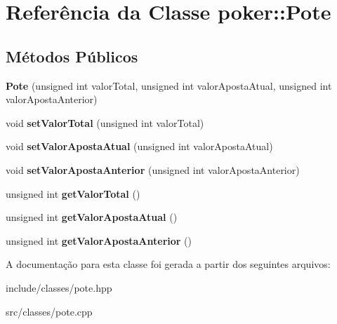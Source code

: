 \hypertarget{classpoker_1_1Pote}{}\section{Referência da Classe poker\+:\+:Pote}
\label{classpoker_1_1Pote}
\subsection*{Métodos Públicos}
\begin{DoxyCompactItemize}
\item 
\mbox{\label{classpoker_1_1Pote_a7cef08264753e9e262811537c40b81eb}} 
{\bfseries Pote} (unsigned int valor\+Total, unsigned int valor\+Aposta\+Atual, unsigned int valor\+Aposta\+Anterior)
\item 
\mbox{\label{classpoker_1_1Pote_a126929e2fed7d8b3deed764a49e31e05}} 
void {\bfseries set\+Valor\+Total} (unsigned int valor\+Total)
\item 
\mbox{\label{classpoker_1_1Pote_a06585f07d25bc2c133bfb0eee08a5b84}} 
void {\bfseries set\+Valor\+Aposta\+Atual} (unsigned int valor\+Aposta\+Atual)
\item 
\mbox{\label{classpoker_1_1Pote_acf4aab4e5eb1494d9dc9169ea4fe1ac1}} 
void {\bfseries set\+Valor\+Aposta\+Anterior} (unsigned int valor\+Aposta\+Anterior)
\item 
\mbox{\label{classpoker_1_1Pote_a79df2aa60ae9addc6f3a663faad85d9a}} 
unsigned int {\bfseries get\+Valor\+Total} ()
\item 
\mbox{\label{classpoker_1_1Pote_a4f5dc5e112c4483d5ea17eb2fe7f7c97}} 
unsigned int {\bfseries get\+Valor\+Aposta\+Atual} ()
\item 
\mbox{\label{classpoker_1_1Pote_a2140c137b7657760bf83e84df23e5978}} 
unsigned int {\bfseries get\+Valor\+Aposta\+Anterior} ()
\end{DoxyCompactItemize}


A documentação para esta classe foi gerada a partir dos seguintes arquivos\+:\begin{DoxyCompactItemize}
\item 
include/classes/pote.\+hpp\item 
src/classes/pote.\+cpp\end{DoxyCompactItemize}
